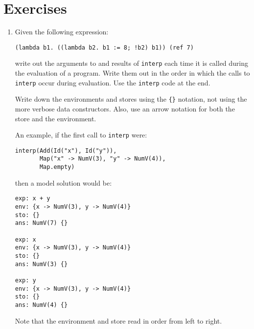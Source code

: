 \section{Exercises}

\begin{enumerate}
\item Given the following expression:

\begin{verbatim}
(lambda b1. ((lambda b2. b1 := 8; !b2) b1)) (ref 7)
\end{verbatim}

write out the arguments to and results of \texttt{interp} each time it is called during
the evaluation of a program.  Write them out in the order in which the calls to \texttt{interp}
occur during evaluation.  Use the \texttt{interp} code at the end.

Write down the environments and stores using the \verb+{}+ notation,
not using the more verbose data constructors.
Also, use an arrow notation for both the store and the environment.

An example, if the first call to \texttt{interp} were:

\begin{verbatim}
interp(Add(Id("x"), Id("y")),
       Map("x" -> NumV(3), "y" -> NumV(4)),
       Map.empty)
\end{verbatim}

then a model solution would be:

\begin{verbatim}
exp: x + y
env: {x -> NumV(3), y -> NumV(4)}
sto: {}
ans: NumV(7) {}

exp: x
env: {x -> NumV(3), y -> NumV(4)}
sto: {}
ans: NumV(3) {}

exp: y
env: {x -> NumV(3), y -> NumV(4)}
sto: {}
ans: NumV(4) {}
\end{verbatim}

Note that the environment and store read in order from left to right.

\end{enumerate}

